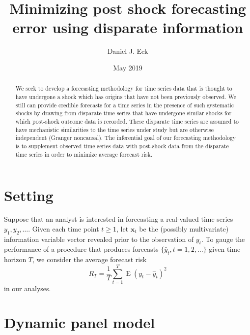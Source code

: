 \documentclass[11pt]{article}
\title{Minimizing post shock forecasting error using disparate information}
\author{Daniel J. Eck}
\date{May 2019}
\newcommand{\x}{\textbf{x}}
\DeclareMathOperator{\E}{E}
\begin{document}
\maketitle
\begin{abstract}
    We seek to develop a forecasting methodology for time series data that is 
    thought to have undergone a shock which has origins that have not been 
    previously observed.  We still can provide credible forecasts for a time 
    series in the presence of such systematic shocks by drawing from disparate 
    time series that have undergone similar shocks for which post-shock 
    outcome data is recorded.  These disparate time series are assumed to have 
    mechanistic similarities to the time series under study but are otherwise 
    independent (Granger noncausal).  The inferential goal of our forecasting 
    methodology is to supplement observed time series data with post-shock 
    data from the disparate time series in order to minimize average forecast 
    risk. 
\end{abstract}


\section{Setting}
Suppose that an analyst is interested in forecasting a real-valued time series 
$y_1, y_2, \ldots$.  Given each time point $t \geq 1$, let $\x_t$ be the 
(possibly multivariate) information variable vector revealed prior to the 
observation of $y_t$.  To gauge the performance of a procedure that produces forecasts 
$\{\hat y_t, t= 1,2,\ldots\}$ given time horizon $T$, we consider the average 
forecast risk
$$
  R_T = \frac{1}{T}\sum_{t=1}^T\E(y_t - \hat y_t)^2
$$
in our analyses.


\section{Dynamic panel model}
\label{sec:dpm}
\end{document}

